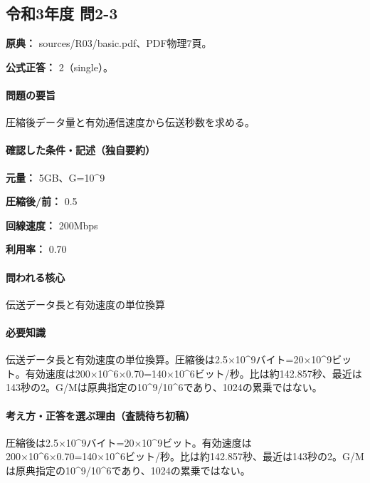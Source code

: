 \subsection{令和3年度 問2-3}
\label{q:r03-reg-basic-2-3}

\noindent\textbf{原典：} sources/R03/basic.pdf、PDF物理7頁。

\textbf{公式正答：} 2（single）。

\paragraph{問題の要旨} 圧縮後データ量と有効通信速度から伝送秒数を求める。

\paragraph{確認した条件・記述（独自要約）}\mbox{}\par

\noindent\textbf{元量：} 5GB、G=\allowbreak{}10\textasciicircum{}9\par

\noindent\textbf{圧縮後/前：} 0.5\par

\noindent\textbf{回線速度：} 200Mbps\par

\noindent\textbf{利用率：} 0.70\par

\paragraph{問われる核心} 伝送データ長と有効速度の単位換算

\paragraph{必要知識} 伝送データ長と有効速度の単位換算。圧縮後は2.5×10\textasciicircum{}9バイト=20×10\textasciicircum{}9ビット。有効速度は200×10\textasciicircum{}6×0.70=\allowbreak{}140×10\textasciicircum{}6ビット/秒。比は約142.857秒、最近は143秒の2。G/Mは原典指定の10\textasciicircum{}9/10\textasciicircum{}6であり、1024の累乗ではない。

\paragraph{考え方・正答を選ぶ理由（査読待ち初稿）} 圧縮後は2.5×10\textasciicircum{}9バイト=20×10\textasciicircum{}9ビット。有効速度は200×10\textasciicircum{}6×0.70=\allowbreak{}140×10\textasciicircum{}6ビット/秒。比は約142.857秒、最近は143秒の2。G/Mは原典指定の10\textasciicircum{}9/10\textasciicircum{}6であり、1024の累乗ではない。

